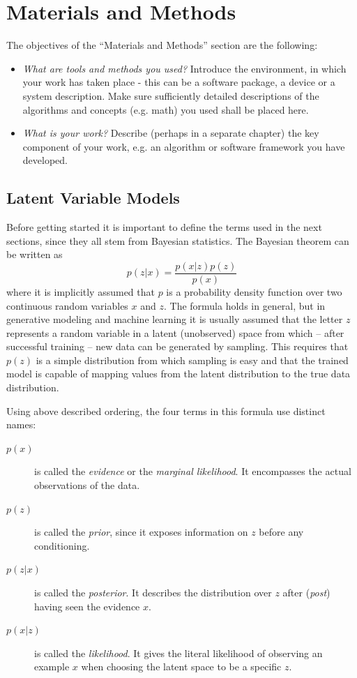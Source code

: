 %
\newpage
\chapter{Materials and Methods}
The objectives of the ``Materials and Methods'' section are the following:
\begin{itemize}
    \item \textit{What are tools and methods you used?} Introduce the environment, in which your work has taken place - this can be a software package, a device or a system description. Make sure sufficiently detailed descriptions of the algorithms and concepts (e.g. math) you used shall be placed here.
    \item \textit{What is your work?} Describe (perhaps in a separate chapter) the key component of your work, e.g. an algorithm or software framework you have developed.
\end{itemize}
\section{Latent Variable Models}
Before getting started it is important to define the terms used in the next sections, since they all stem from Bayesian
statistics. The Bayesian theorem can be written as
\begin{equation}
    p(z|x) = \frac{p(x|z)p(z)}{p(x)}
\end{equation}
where it is implicitly assumed that $p$ is a probability density function over two continuous random variables $x$ and $z$. The formula holds in general, but in generative modeling and machine learning it is usually assumed that the letter $z$ represents a random variable in a latent (unobserved) space from which -- after successful training -- new data can be generated by sampling. This requires that $p(z)$ is a simple distribution from which sampling is easy and that the trained model is capable of mapping values from the latent distribution to the true data distribution.

Using above described ordering, the four terms in this formula use distinct names:
\begin{description}
    \item[$p(x)$] is called the \textit{evidence} or the \textit{marginal likelihood}. It encompasses the actual observations of the data.
    \item[$p(z)$] is called the \textit{prior}, since it exposes information on $z$ before any conditioning.
    \item[$p(z|x)$] is called the \textit{posterior}. It describes the distribution over $z$ after (\textit{post}) having seen the evidence $x$.
    \item[$p(x|z)$] is called the \textit{likelihood}. It gives the literal likelihood of observing an example $x$ when choosing the latent space to be a specific $z$.
\end{description}

